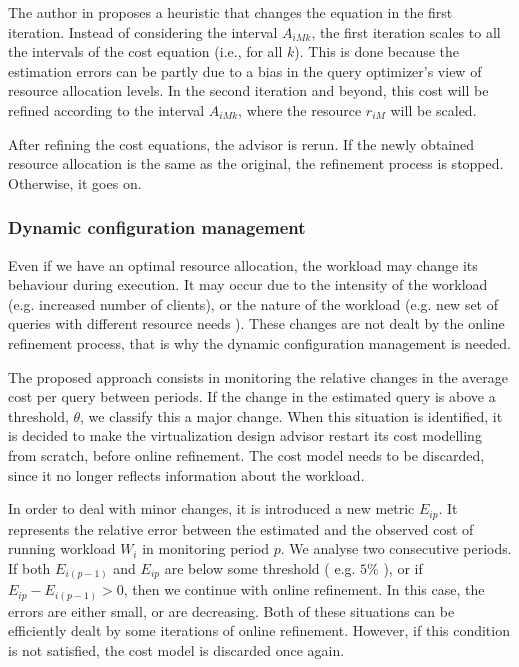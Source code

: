 The author in \cite{Soror:2008:AVM:1376616.1376711} proposes a heuristic that changes the equation in the first iteration. Instead of  considering the interval $A_{iMk}$, the first iteration scales to all the intervals of the cost equation (i.e., for all $k$). This is done because the estimation errors can be partly due to a bias in the query optimizer's view of resource allocation levels. In the second iteration and beyond, this cost will be refined according to the interval $A_{iMk}$, where the resource $r_{iM}$ will be scaled.


After refining the cost equations, the advisor is rerun. If the newly obtained resource allocation is the same as the original, the refinement process is stopped. Otherwise, it goes on.

\subsubsection{Dynamic configuration management}

\label{subsec:dcm}
Even if we have an optimal resource allocation, the workload may change its behaviour during execution. It may occur due to the intensity of the workload (e.g. increased number of clients), or the nature of the workload (e.g. new set of queries with different resource needs ). These changes are not dealt by the online refinement process, that is why the dynamic configuration management is needed. 

The proposed approach consists in monitoring the relative changes in the average cost per query between periods. If the change in the estimated query is above a threshold, $\theta$, we classify this a major change. When this situation is identified, it is decided to make the virtualization design advisor restart its cost modelling from scratch, before online refinement. The cost model needs to be discarded, since it no longer reflects information about the workload.

In order to deal with minor changes, it is introduced a new metric $E_{ip}$. It represents the relative error between the estimated and the observed cost of running workload $W_{i}$ in monitoring period $p$. We analyse two consecutive periods. If both $E_{i(p-1)}$ and $E_{ip}$ are below some threshold ( e.g. $5\%$ ), or if $E_{ip} - E_{i(p-1)} > 0$, then we continue with online refinement. In this case, the errors are either small, or are decreasing. Both of these situations can be efficiently dealt by some iterations of online refinement. However, if this condition is not satisfied, the cost model is discarded once again. 